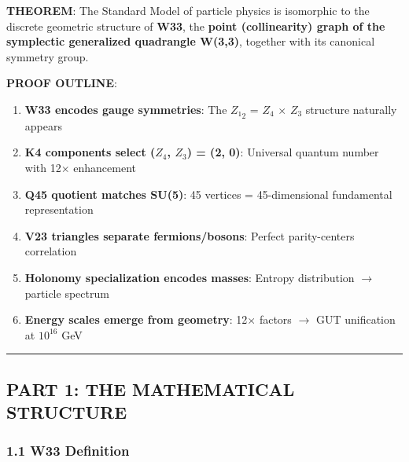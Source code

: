 \documentclass[11pt]{article}
\providecommand{\tightlist}{%
  \setlength{\itemsep}{0pt}\setlength{\parskip}{0pt}}
\begin{document}
\textbf{THEOREM}: The Standard Model of particle physics is isomorphic
to the discrete geometric structure of \textbf{W33}, the \textbf{point
(collinearity) graph of the symplectic generalized quadrangle W(3,3)},
together with its canonical symmetry group.

\textbf{PROOF OUTLINE}:

\begin{enumerate}
\def\labelenumi{\arabic{enumi}.}
\tightlist
\item
  \textbf{W33 encodes gauge symmetries}: The \(Z₁_{2}\) = \(Z_{4}\)
  \ensuremath{\times} \(Z_{3}\) structure naturally appears
\item
  \textbf{K4 components select (\(Z_{4}\), \(Z_{3}\)) = (2, 0)}:
  Universal quantum number with 12\ensuremath{\times} enhancement
\item
  \textbf{Q45 quotient matches SU(5)}: 45 vertices = 45-dimensional
  fundamental representation
\item
  \textbf{V23 triangles separate fermions/bosons}: Perfect
  parity-centers correlation
\item
  \textbf{Holonomy specialization encodes masses}: Entropy distribution
  \ensuremath{\rightarrow} particle spectrum
\item
  \textbf{Energy scales emerge from geometry}: 12\ensuremath{\times}
  factors \ensuremath{\rightarrow} GUT unification at \(10^{16}\) GeV
\end{enumerate}

\begin{center}\rule{0.5\linewidth}{0.5pt}\end{center}

\subsection{PART 1: THE MATHEMATICAL
STRUCTURE}\label{part-1-the-mathematical-structure}

\subsubsection{1.1 W33 Definition}\label{w33-definition}
\end{document}
